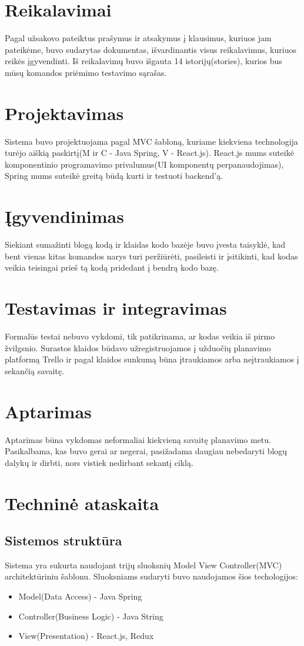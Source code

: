 \documentclass{VUMIFInfKursinis}
\begin{document}
\section{Reikalavimai}
Pagal užsakovo pateiktus prašymus ir atsakymus į klausimus, kuriuos jam pateikėme, buvo sudarytas dokumentas, išvardinantis visus reikalavimus, kuriuos reikės įgyvendinti. Iš reikalavimų buvo išgauta 14 istorijų(stories), kurios bus mūsų komandos priėmimo testavimo sąrašas.
\section{Projektavimas}
Sistema buvo projektuojama pagal MVC šabloną, kuriame kiekviena technologija turėjo aiškią paskirtį(M ir C - Java Spring, V - React.js). React.js mums suteikė komponentinio programavimo privalumus(UI komponentų perpanaudojimas), Spring mums suteikė greitą būdą kurti ir testuoti backend'ą.
\section{Įgyvendinimas}
Siekiant sumažinti blogą kodą ir klaidas kodo bazėje buvo įvesta taisyklė, kad bent vienas kitas komandos narys turi peržiūrėti, pasileisti ir įsitikinti, kad kodas veikia teisingai prieš tą kodą pridedant į bendrą kodo bazę.
\section{Testavimas ir integravimas}
Formalūs testai nebuvo vykdomi, tik patikrinama, ar kodas veikia iš pirmo žvilgsnio. Surastos klaidos būdavo užregistruojamos į užduočių planavimo platformą Trello ir pagal klaidos sunkumą būna įtraukiamos arba neįtraukiamos į sekančią savaitę.
\section{Aptarimas}
Aptarimas būna vykdomas neformaliai kiekvieną savaitę planavimo metu. Pasikalbama, kas buvo gerai ar negerai, pasižadama daugiau nebedaryti blogų dalykų ir dirbti, nors vistiek nedirbant sekantį ciklą.

\pagebreak

\section{Techninė ataskaita}
\subsection{Sistemos struktūra}
Sistema yra sukurta naudojant trijų sluoksnių Model View Controller(MVC) architektūriniu šablonu. Sluoksniams sudaryti buvo naudojamos šios techologijos:
\begin{itemize}
	\item{Model(Data Access) -  Java Spring}
	\item{Controller(Business Logic) - Java String}
	\item{View(Presentation) - React.js, Redux}
\end{itemize}  
\end{document}
